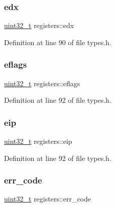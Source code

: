 \subsubsection{\texorpdfstring{edx}{edx}}
{\footnotesize\ttfamily \hyperlink{a00134_a435d1572bf3f880d55459d9805097f62_a435d1572bf3f880d55459d9805097f62}{uint32\+\_\+t} registers\+::edx}



Definition at line 90 of file types.\+h.

\mbox{\label{a00252_af9a17981c1cdac71d6f82ba32466a036_af9a17981c1cdac71d6f82ba32466a036}} 
\subsubsection{\texorpdfstring{eflags}{eflags}}
{\footnotesize\ttfamily \hyperlink{a00134_a435d1572bf3f880d55459d9805097f62_a435d1572bf3f880d55459d9805097f62}{uint32\+\_\+t} registers\+::eflags}



Definition at line 92 of file types.\+h.

\mbox{\label{a00252_aaeedf83509826a731e436025aeb53576_aaeedf83509826a731e436025aeb53576}} 
\subsubsection{\texorpdfstring{eip}{eip}}
{\footnotesize\ttfamily \hyperlink{a00134_a435d1572bf3f880d55459d9805097f62_a435d1572bf3f880d55459d9805097f62}{uint32\+\_\+t} registers\+::eip}



Definition at line 92 of file types.\+h.

\mbox{\label{a00252_a1f90b3d484c66002c9ffcd0e54e97c2c_a1f90b3d484c66002c9ffcd0e54e97c2c}} 
\subsubsection{\texorpdfstring{err\+\_\+code}{err\_code}}
{\footnotesize\ttfamily \hyperlink{a00134_a435d1572bf3f880d55459d9805097f62_a435d1572bf3f880d55459d9805097f62}{uint32\+\_\+t} registers\+::err\+\_\+code}



